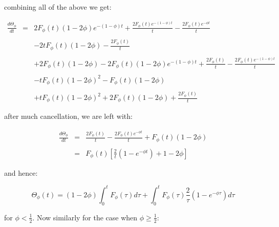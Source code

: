 combining all of the above we get: \bigskip

\begin{eqnarray*}
	\frac{d \Theta_{\phi}}{dt} & = & 2 F_{\phi}(t) (1 - 2 \phi) e^{-(1 - \phi) t} + \frac{2 F_{\phi}(t) e^{-(1 - \phi)t}}{t} - \frac{2 F_{\phi}(t) e^{-\phi t}}{t} \\\\
							   &   & - 2 t F_{\phi}(t) (1 - 2 \phi) - \frac{2 F_{\phi}(t)}{t} \\\\
							   &   & + 2 F_{\phi}(t) (1 - 2 \phi) - 2 F_{\phi}(t) (1 - 2 \phi) e^{-(1 - \phi)t} + \frac{2 F_{\phi}(t)}{t} - \frac{2 F_{\phi}(t) e^{-(1 - \phi)t}}{t} \\\\
							   &   & - t F_{\phi}(t) (1 - 2 \phi)^2 - F_{\phi}(t) (1 - 2 \phi) \\\\
							   &   & + t F_{\phi}(t) (1 - 2 \phi)^2 + 2 F_{\phi}(t) (1 - 2 \phi) + \frac{2 F_{\phi}(t)}{t} 
\end{eqnarray*}\medskip

after much cancellation, we are left with: \bigskip

\begin{eqnarray*}
	\frac{d \Theta_{\phi}}{dt} & = & \frac{2 F_{\phi}(t)}{t} - \frac{2 F_{\phi}(t) e^{-\phi t}}{t} + F_{\phi}(t) (1 - 2 \phi) \\\\
							   & = & F_{\phi}(t) \left[ \frac{2}{t} (1 - e^{-\phi t}) + 1 - 2 \phi \right]
\end{eqnarray*}\medskip

and hence: \bigskip

\[
	\Theta_{\phi} (t) = (1 - 2 \phi) \int_{0}^{t} F_{\phi}(\tau) d \tau  + \int_{0}^{t} F_{\phi}(\tau) \frac{2}{\tau} (1 - e^{-\phi \tau}) d \tau
\]\medskip

for $\phi < \frac{1}{2}$. Now similarly for the case when $\phi \geq \frac{1}{2}$: \bigskip

